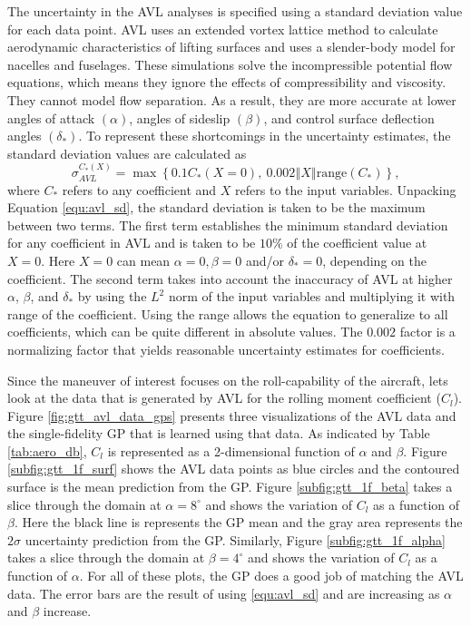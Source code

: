 The uncertainty in the AVL analyses is specified using a standard deviation value for each data point. 
AVL uses an extended vortex lattice method to calculate aerodynamic characteristics of lifting surfaces and uses a slender-body model for nacelles and fuselages. 
These simulations solve the incompressible potential flow equations, which means they ignore the effects of compressibility and viscosity. 
They cannot model flow separation.
As a result, they are more accurate at lower angles of attack $(\alpha)$, angles of sideslip $(\beta)$, and control surface deflection angles $(\delta_*)$.
To represent these shortcomings in the uncertainty estimates, the standard deviation values are calculated as
\begin{equation}\label{equ:avl_sd}
    \sigma_{AVL}^{C_*(X)} = \max \left \{ 0.1C_*(X=0),~0.002 \left \Vert X \right \Vert \mathrm{range}(C_*) \right \},
\end{equation}
where $C_*$ refers to any coefficient and $X$ refers to the input variables.
Unpacking Equation \ref{equ:avl_sd}, the standard deviation is taken to be the maximum between two terms.
The first term establishes the minimum standard deviation for any coefficient in AVL and is taken to be $10\%$ of the coefficient value at $X =0$. 
Here $X=0$ can mean $\alpha=0, \beta=0$ and/or $\delta_* = 0$, depending on the coefficient.
The second term takes into account the inaccuracy of AVL at higher $\alpha$, $\beta$, and $\delta_*$ by using the $L^2$ norm of the input variables and multiplying it with range of the coefficient.
Using the range allows the equation to generalize to all coefficients, which can be quite different in absolute values.
The $0.002$ factor is a normalizing factor that yields reasonable uncertainty estimates for coefficients.

Since the maneuver of interest focuses on the roll-capability of the aircraft, lets look at the data that is generated by AVL for the rolling moment coefficient ($C_l$).
Figure \ref{fig:gtt_avl_data_gps} presents three visualizations of the AVL data and the single-fidelity GP that is learned using that data. 
As indicated by Table \ref{tab:aero_db}, $C_l$ is represented as a 2-dimensional function of $\alpha$ and $\beta$. 
Figure \ref{subfig:gtt_1f_surf} shows the AVL data points as blue circles and the contoured surface is the mean prediction from the GP. 
Figure \ref{subfig:gtt_1f_beta} takes a slice through the domain at $\alpha = 8^\circ$ and shows the variation of $C_l$ as a function of $\beta$. 
Here the black line is represents the GP mean and the gray area represents the $2\sigma$ uncertainty prediction from the GP.
Similarly, Figure \ref{subfig:gtt_1f_alpha} takes a slice through the domain at $\beta = 4^\circ$ and shows the variation of $C_l$ as a function of $\alpha$. 
For all of these plots, the GP does a good job of matching the AVL data. 
The error bars are the result of using \ref{equ:avl_sd} and are increasing as $\alpha$ and $\beta$ increase. 


